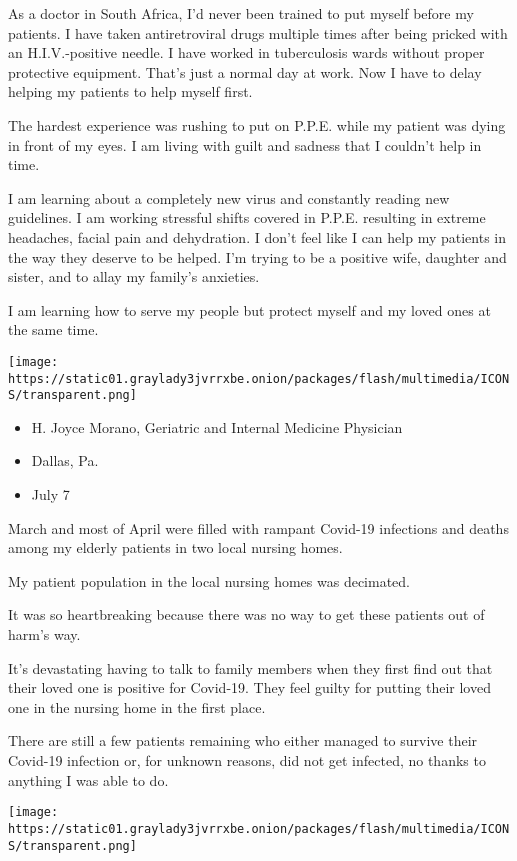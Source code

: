 As a doctor in South Africa, I'd never been trained to put myself before
my patients. I have taken antiretroviral drugs multiple times after
being pricked with an H.I.V.-positive needle. I have worked in
tuberculosis wards without proper protective equipment. That's just a
normal day at work. Now I have to delay helping my patients to help
myself first.

The hardest experience was rushing to put on P.P.E. while my patient was
dying in front of my eyes. I am living with guilt and sadness that I
couldn't help in time.

I am learning about a completely new virus and constantly reading new
guidelines. I am working stressful shifts covered in P.P.E. resulting in
extreme headaches, facial pain and dehydration. I don't feel like I can
help my patients in the way they deserve to be helped. I'm trying to be
a positive wife, daughter and sister, and to allay my family's
anxieties.

I am learning how to serve my people but protect myself and my loved
ones at the same time.

\texttt{[image: https://static01.graylady3jvrrxbe.onion/packages/flash/multimedia/ICONS/transparent.png]}

\begin{itemize}
\tightlist
\item
  H. Joyce Morano, Geriatric and Internal Medicine Physician
\item
  Dallas, Pa.
\item
  July 7
\end{itemize}

March and most of April were filled with rampant Covid-19 infections and
deaths among my elderly patients in two local nursing homes.

My patient population in the local nursing homes was decimated.

It was so heartbreaking because there was no way to get these patients
out of harm's way.

It's devastating having to talk to family members when they first find
out that their loved one is positive for Covid-19. They feel guilty for
putting their loved one in the nursing home in the first place.

There are still a few patients remaining who either managed to survive
their Covid-19 infection or, for unknown reasons, did not get infected,
no thanks to anything I was able to do.

\texttt{[image: https://static01.graylady3jvrrxbe.onion/packages/flash/multimedia/ICONS/transparent.png]}

